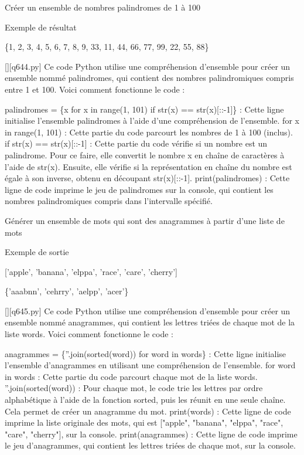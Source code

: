         \question
        Créer un ensemble de nombres palindromes de 1 à 100

Exemple de résultat

\{1, 2, 3, 4, 5, 6, 7, 8, 9, 33, 11, 44, 66, 77, 99, 22, 55, 88\}
        \par
        \begin{solution}
            \renewcommand{\nomfichier}{q644.py}
            \pythonfile{\chemincode \nomfichier}[][\nomfichier]
            Ce code Python utilise une compréhension d'ensemble pour créer un ensemble nommé palindromes, qui contient des nombres palindromiques compris entre 1 et 100. Voici comment fonctionne le code :

    palindromes = \{x for x in range(1, 101) if str(x) == str(x)[::-1]\} : Cette ligne initialise l'ensemble palindromes à l'aide d'une compréhension de l'ensemble.
        for x in range(1, 101) : Cette partie du code parcourt les nombres de 1 à 100 (inclus).
        if str(x) == str(x)[::-1] : Cette partie du code vérifie si un nombre est un palindrome. Pour ce faire, elle convertit le nombre x en chaîne de caractères à l'aide de str(x). Ensuite, elle vérifie si la représentation en chaîne du nombre est égale à son inverse, obtenu en découpant str(x)[::-1].
    print(palindromes) : Cette ligne de code imprime le jeu de palindromes sur la console, qui contient les nombres palindromiques compris dans l'intervalle spécifié.
        \end{solution}
        

        \question
        Générer un ensemble de mots qui sont des anagrammes à partir d'une liste de mots

Exemple de sortie

['apple', 'banana', 'elppa', 'race', 'care', 'cherry']

\{'aaabnn', 'cehrry', 'aelpp', 'acer'\}
        \par
        \begin{solution}
            \renewcommand{\nomfichier}{q645.py}
            \pythonfile{\chemincode \nomfichier}[][\nomfichier]
            Ce code Python utilise une compréhension d'ensemble pour créer un ensemble nommé anagrammes, qui contient les lettres triées de chaque mot de la liste words. Voici comment fonctionne le code :

    anagrammes = \{''.join(sorted(word)) for word in words\} : Cette ligne initialise l'ensemble d'anagrammes en utilisant une compréhension de l'ensemble.
        for word in words : Cette partie du code parcourt chaque mot de la liste words.
        ''.join(sorted(word)) : Pour chaque mot, le code trie les lettres par ordre alphabétique à l'aide de la fonction sorted, puis les réunit en une seule chaîne. Cela permet de créer un anagramme du mot.
    print(words) : Cette ligne de code imprime la liste originale des mots, qui est ["apple", "banana", "elppa", "race", "care", "cherry"], sur la console.
    print(anagrammes) : Cette ligne de code imprime le jeu d'anagrammes, qui contient les lettres triées de chaque mot, sur la console.
        \end{solution}
        

